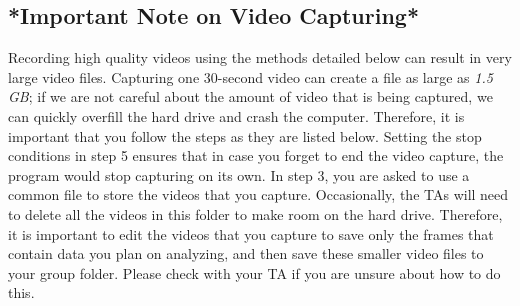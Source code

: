 \subsection*{*Important Note on Video Capturing*}
Recording high quality videos using the methods detailed below can result in very large video files. Capturing one 30-second video can create a file as large as \emph{1.5 GB}; if we are not careful about the amount of video that is being captured, we can quickly overfill the hard drive and crash the computer. Therefore, it is important that you follow the steps as they are listed below. Setting the stop conditions in step 5 ensures that in case you forget to end the video capture, the program would stop capturing on its own. In step 3, you are asked to use a common file to store the videos that you capture. Occasionally, the TAs will need to delete all the videos in this folder to make room on the hard drive. Therefore, it is important to edit the videos that you capture to save only the frames that contain data you plan on analyzing, and then save these smaller video files to your group folder. Please check with your TA if you are unsure about how to do this.

